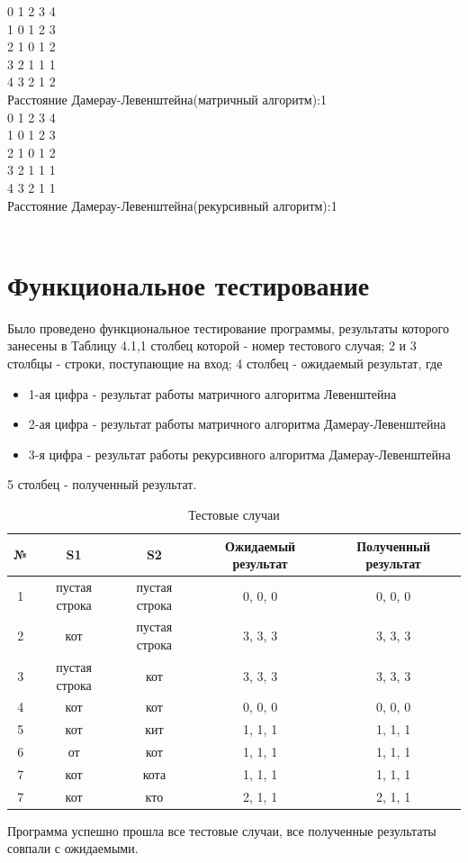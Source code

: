 \documentclass[a4paper,12pt]{report}
\begin{document}
0 1 2 3 4\\
1 0 1 2 3\\
2 1 0 1 2\\
3 2 1 1 1\\
4 3 2 1 2\\
Расстояние Дамерау-Левенштейна(матричный алгоритм):1\\
0 1 2 3 4\\
1 0 1 2 3\\
2 1 0 1 2\\
3 2 1 1 1\\
4 3 2 1 1\\
Расстояние Дамерау-Левенштейна(рекурсивный алгоритм):1\\\\
    
\section{Функциональное тестирование}
Было проведено функциональное тестирование программы, результаты которого занесены в Таблицу 4.1,1 столбец которой - номер тестового случая; 2 и 3 столбцы - строки, поступающие на вход; 4 столбец - ожидаемый результат, где 
	\begin{itemize}
		\item 1-ая цифра - результат работы матричного алгоритма Левенштейна
		\item 2-ая цифра - результат работы матричного алгоритма Дамерау-Левенштейна
		\item 3-я цифра - результат работы рекурсивного алгоритма Дамерау-Левенштейна
	\end{itemize}
5 столбец - полученный результат. 

\begin{table}
\begin{center}
\begin{tabular}{| c | c | c | c | c |}
\hline
№ & S1 & S2 & Ожидаемый результат & Полученный результат \\
\hline
1 & пустая строка & пустая строка & 0, 0, 0 & 0, 0, 0\\
\hline
2 & кот & пустая строка & 3, 3, 3 & 3, 3, 3\\
\hline
3 & пустая строка & кот & 3, 3, 3 & 3, 3, 3\\
\hline
4 & кот & кот & 0, 0, 0 & 0, 0, 0\\
\hline
5 & кот & кит & 1, 1, 1 & 1, 1, 1\\
\hline
6 & от & кот & 1, 1, 1 & 1, 1, 1\\
\hline
7 & кот & кота & 1, 1, 1 & 1, 1, 1\\
\hline
7 & кот & кто & 2, 1, 1 & 2, 1, 1\\
\hline
\end{tabular}
\caption{Тестовые случаи}
\end{center}
\end{table}
\newpage 
Программа успешно прошла все тестовые случаи, все полученные результаты совпали с ожидаемыми.
\end{document}
